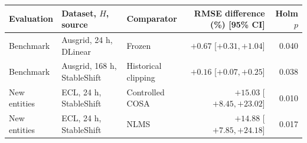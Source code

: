 \begin{tabular}{lllrr}
\toprule
Evaluation & Dataset, $H$, source & Comparator & RMSE difference (\%) [95\% CI] & Holm $p$\\
\midrule
Benchmark & Ausgrid, 24 h, DLinear & Frozen & $+0.67$ [$+0.31, +1.04$] & 0.040\\
Benchmark & Ausgrid, 168 h, StableShift & Historical clipping & $+0.16$ [$+0.07, +0.25$] & 0.038\\
New entities & ECL, 24 h, StableShift & Controlled COSA & $+15.03$ [$+8.45, +23.02$] & 0.010\\
New entities & ECL, 24 h, StableShift & NLMS & $+14.88$ [$+7.85, +24.18$] & 0.017\\
\bottomrule
\end{tabular}
